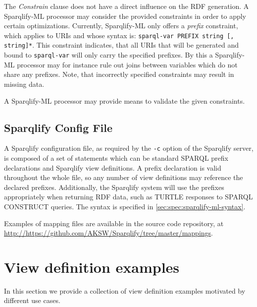 \documentclass[a4paper,twoside,bibtotoc,abstracton,12pt,BCOR=15mm]{scrreprt}
\begin{document}
The \emph{Constrain} clause does not have a direct influence on the RDF generation. 
A Sparqlify-ML processor may consider the provided constraints in order to apply certain optimizations.
Currently, Sparqlify-ML only offers a \emph{prefix} constraint, which applies to URIs and whose 
syntax is: \texttt{sparql-var PREFIX string [, string]*}.
This constraint indicates, that all URIs that will be generated and bound to \texttt{sparql-var} will only carry the specified prefixes.
By this a Sparqlify-ML processor may for instance rule out joins between variables which do not share any prefixes.
Note, that incorrectly specified constraints may result in missing data.
  
A Sparqlify-ML processor may provide means to validate the given constraints.


\subsection{Sparqlify Config File}
\label{sect:sparqlify-config-file}
A Sparqlify configuration file, as required by the \texttt{-c} option of the Sparqlify server, is composed of a set of statements
which can be standard SPARQL prefix declarations and Sparqlify view definitions.
A prefix declaration is valid throughout the whole file, so any number of view definitions may reference the declared prefixes.
Additionally, the Sparqlify system will use the prefixes appropriately when returning RDF data, such as TURTLE responses to SPARQL CONSTRUCT queries.    
The syntax is specified in \autoref{sec:spec:sparqlify-ml-syntax}.

Examples of mapping files are available in the source code repository, at \url{http://https://github.com/AKSW/Sparqlify/tree/master/mappings}.

\newpage
\section{View definition examples}
In this section we provide a collection of view definition examples motivated by different use cases.
\end{document}
